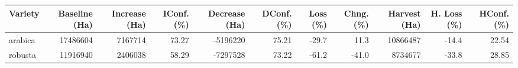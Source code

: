 \begin{table}[ht]
\centering
\begin{tabular}{lrrrrrrrrrr}
  \hline
Variety & Baseline (Ha) & Increase (Ha) & IConf. (\%) & Decrease (Ha) & DConf. (\%) & Loss (\%) & Chng. (\%) & Harvest (Ha) & H. Loss (\%) & HConf. (\%) \\ 
  \hline
arabica & 17486604 & 7167714 & 73.27 & -5196220 & 75.21 & -29.7 & 11.3 & 10866487 & -14.4 & 22.54 \\ 
  robusta & 11916940 & 2406038 & 58.29 & -7297528 & 73.22 & -61.2 & -41.0 & 8734677 & -33.8 & 28.85 \\ 
   \hline
\end{tabular}
\end{table}
